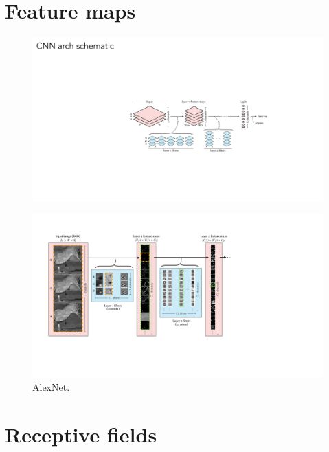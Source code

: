 \section{Feature maps}

\begin{figure}[t]
\centerline{
\includegraphics[width=1.0\linewidth]{./figures/convolutional_neural_nets/feature_maps_schematic.pdf}}
\caption{}
\label{fig:convolutional_neural_nets/feature_maps_schematic}
\end{figure}

\begin{figure}[t]
\centerline{
\includegraphics[width=1.0\linewidth]{./figures/convolutional_neural_nets/alexnet_feature_maps.pdf}}
\caption{AlexNet.}
\label{fig:convolutional_neural_nets/alexnet_feature_maps}
\end{figure}

\section{Receptive fields}

